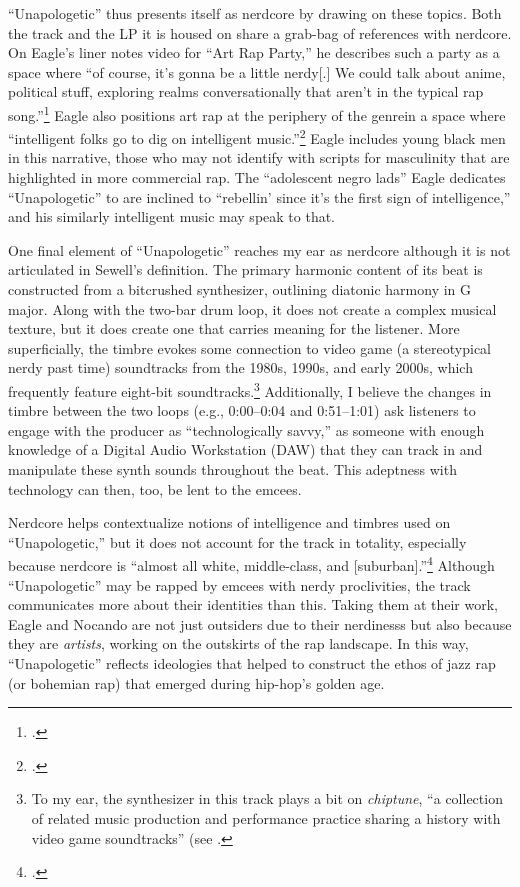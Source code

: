 ``Unapologetic'' thus presents itself as nerdcore by drawing on these topics. Both the track and the
LP it is housed on share a grab-bag of references with nerdcore. On Eagle's liner notes video for ``Art
Rap Party,'' he describes such a party as a space where ``of course, it's gonna be a little nerdy[.]
\textellipsis We could talk about anime, \textellipsis political stuff, exploring realms conversationally
that aren't in the typical rap song.''\footnote{
    \cite{openmikeeagleVideoLinerNotes2010}.}
Eagle also positions art rap at the periphery of the genre\textemdash in a space where ``intelligent
folks go to dig on intelligent music.''\footnote{
    \cite{openmikeeagleVideoLinerNotes2010}.} 
Eagle includes young black men in this narrative, those who may not identify with scripts for masculinity
that are highlighted in more commercial rap. The ``adolescent negro lads'' Eagle dedicates ``Unapologetic''
to  are inclined  to ``rebellin' since it's the first sign of intelligence,'' and his similarly intelligent
music may speak to that.

One final element of ``Unapologetic'' reaches my ear as nerdcore although it is not articulated in Sewell's
definition. The primary harmonic content of its beat is constructed from a bitcrushed synthesizer, outlining
diatonic harmony in G major. Along with the two-bar drum loop, it does not create a complex musical texture,
but it does create one that carries meaning for the listener. More superficially, the timbre evokes some 
connection to video game (a stereotypical nerdy past time) soundtracks from the 1980s, 1990s, and early 
2000s, which frequently feature eight-bit soundtracks.\footnote{
    To my ear, the synthesizer in this track plays a bit on \emph{chiptune}, ``a collection of related
    music production and performance practice sharing a history with video game soundtracks'' (see
    \cite{kevindriscollEndlessLoopBrief2009}.}
Additionally, I believe the changes in timbre between  the two loops (e.g., 0:00--0:04 and 0:51--1:01) ask
listeners to engage with the producer as ``technologically savvy,'' as someone with enough knowledge of
a Digital Audio Workstation (DAW) that they can track in and manipulate these synth sounds throughout
the beat. This adeptness with technology can then, too, be lent to the emcees. 

Nerdcore helps contextualize notions of intelligence and timbres used on ``Unapologetic,'' but it does
not account for the track in totality, especially because nerdcore is ``almost all white, middle-class, 
and [suburban].''\footnote{
    \autocite[223]{amandasewellNerdcoreHiphop2015}.} 
Although ``Unapologetic'' may be rapped by emcees with nerdy proclivities, the track communicates more
about their identities than this. Taking them at their work, Eagle and Nocando are not just outsiders 
due to their nerdinesss but also because they are \emph{artists}, working on the outskirts of the rap
landscape.  In this way, ``Unapologetic'' reflects ideologies that helped to construct the ethos of 
jazz rap (or bohemian rap) that emerged during hip-hop's golden age.

